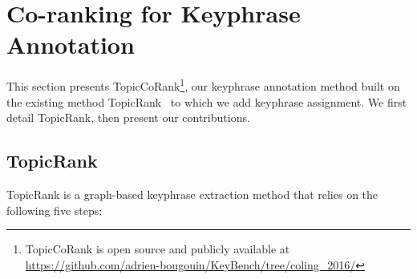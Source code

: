 \section{Co-ranking for Keyphrase Annotation}
\label{sec:topicrankpp}
    This section presents TopicCoRank\footnote{TopicCoRank is open source and publicly available at \url{https://github.com/adrien-bougouin/KeyBench/tree/coling_2016/}}, our keyphrase annotation method built on the existing method TopicRank~\cite{bougouin2013topicrank} to which we add keyphrase assignment.
    We first detail TopicRank, then present our contributions.
    
    \subsection{TopicRank}
    \label{subsec:topicrank}
        TopicRank is a graph-based keyphrase extraction method that relies on the following five steps:
